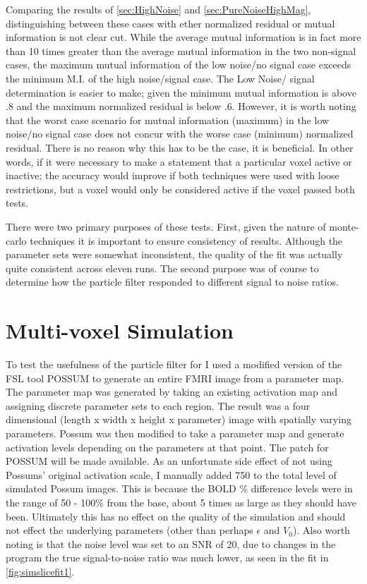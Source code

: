 Comparing the results of \autoref{sec:HighNoise} and \autoref{sec:PureNoiseHighMag}, 
distinguishing between these cases with ether normalized residual or mutual information
is not clear cut. While the average mutual information is in fact more than 10 times
greater than the average mutual information in the two non-signal cases, the maximum
mutual information of the low noise/no signal case exceeds the minimum M.I. of the high noise/signal
case. The Low Noise/ signal determination is easier to make; given
the minimum mutual information is above $.8$ and the maximum normalized residual is below $.6$.
However, it is worth noting that the worst case scenario  for mutual information (maximum) in the
low noise/no signal case does not concur with the worse case (minimum) normalized residual. 
There is no reason why this has to be the case, it is beneficial. In
other words, if it were necessary to make a statement that
a particular voxel active or inactive; the accuracy would improve if both techniques
were used with loose restrictions, but a voxel would only be considered active if the
voxel passed both tests. 

There were two primary purposes of these tests. First, given the nature of monte-carlo
techniques it is important to ensure consistency of results. Although the parameter
sets were somewhat inconsistent, the quality of the fit was actually quite consistent
across eleven runs. The second purpose was of course to determine how the particle 
filter responded to different signal to noise ratios. 

\section{Multi-voxel Simulation}
To test the usefulness of the particle filter for I used a modified version of the FSL tool 
POSSUM to generate an entire FMRI image from a parameter map. The parameter map was generated
by taking an existing activation map and assigning discrete parameter sets to each region.
The result was a four dimensional (length x width
x height x parameter) image with spatially varying parameters. Possum was then modified
to take a parameter map and generate activation levels depending on the parameters at that
point. The patch for POSSUM will be made available. As an unfortunate side effect of 
not using Possums' original activation scale, I manually added 750 to the total level of
simulated Possum images. This is because the BOLD \% difference levels were in the range
of 50 - 100\% from the base, about 5 times as large as they should have been. Ultimately
this has no effect on the quality of the simulation and should not effect the 
underlying parameters (other than perhaps $\epsilon$ and $V_0$). 
Also worth noting is that the noise level was set to an SNR of 20, due to changes in the 
program the true signal-to-noise ratio was much lower, as seen in the fit in \autoref{fig:simslicefit1}.

